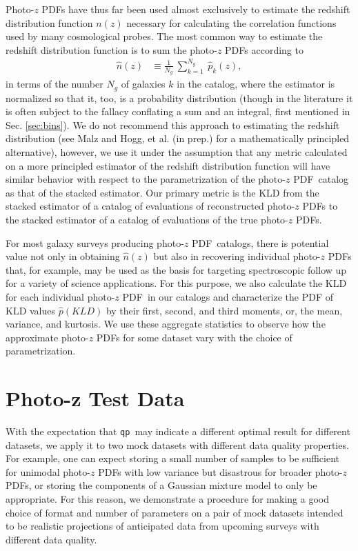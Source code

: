 \documentclass[\docopts]{\docclass}
\newcommand{\qp}{\texttt{qp}}
\newcommand{\pz}{photo-$z$ PDF}
\newcommand{\Pz}{Photo-$z$ PDF}
\begin{document}
\Pz s have thus far been used almost exclusively to estimate the redshift 
distribution function $n(z)$ necessary for calculating the correlation 
functions used by many cosmological probes.  The most common way to estimate 
the redshift distribution function is to sum the \pz s according to
\begin{align}
  \label{eq:nz}
  \hat{n}(z) &\equiv \frac{1}{N_{g}}\ \sum_{k=1}^{N_{g}}\ \hat{p}_{k}(z),
\end{align}
in terms of the number $N_{g}$ of galaxies $k$ in the catalog, where the 
estimator is normalized so that it, too, is a probability distribution (though 
in the literature it is often subject to the fallacy conflating a sum and an 
integral, first mentioned in Sec. \ref{sec:bins}).  We do not recommend this 
approach to estimating the redshift distribution (see Malz and Hogg, et al. (in 
prep.) for a mathematically principled alternative), however, we use it under 
the assumption that any metric calculated on a more principled estimator of the 
redshift distribution function will have similar behavior with respect to the 
parametrization of the \pz\ catalog as that of the stacked estimator.  Our 
primary metric is the KLD from the stacked estimator of a catalog of 
evaluations of reconstructed \pz s to the stacked estimator of a catalog of 
evaluations of the true \pz s.

For most galaxy surveys producing \pz\ catalogs, there is potential value not 
only in obtaining $\hat{n}(z)$ but also in recovering individual \pz s that, 
for example, may be used as the basis for targeting spectroscopic follow up for 
a variety of science applications.  For this purpose, we also calculate the KLD 
for each individual \pz\ in our catalogs and characterize the PDF of KLD values 
$\hat{p}(KLD)$ by their first, second, and third moments, or, the mean, 
variance, and kurtosis.  We use these aggregate statistics to observe how the 
approximate \pz s for some dataset vary with the choice of parametrization.





\section{Photo-z Test Data}
\label{sec:data}

With the expectation that \qp\  may indicate a different optimal result for 
different datasets, we apply it to two mock datasets with different data 
quality properties.  For example, one can expect storing a small number of 
samples to be sufficient for unimodal \pz s with low variance but disastrous 
for broader \pz s, or storing the components of a Gaussian mixture model to 
only be appropriate.  For this reason, we demonstrate a procedure for making a 
good choice of format and number of parameters on a pair of mock datasets 
intended to be realistic projections of anticipated data from upcoming surveys 
with different data quality.
\end{document}
